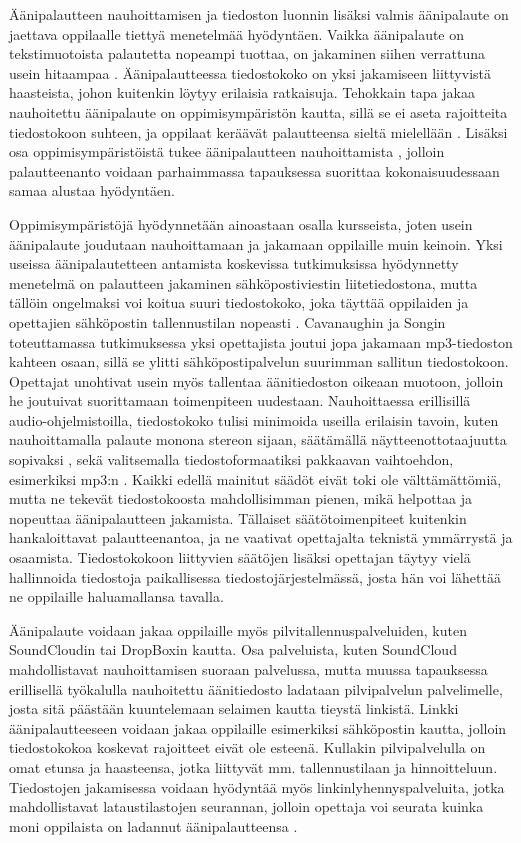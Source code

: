 \documentclass[utf8]{gradu3}
\begin{document}
Äänipalautteen nauhoittamisen ja tiedoston luonnin lisäksi valmis äänipalaute on jaettava oppilaalle tiettyä menetelmää hyödyntäen. Vaikka äänipalaute on tekstimuotoista palautetta nopeampi tuottaa, on jakaminen siihen verrattuna usein hitaampaa \parencite{evaluating}. Äänipalautteessa tiedostokoko on yksi jakamiseen liittyvistä haasteista, johon kuitenkin löytyy erilaisia ratkaisuja. Tehokkain tapa jakaa nauhoitettu äänipalaute on oppimisympäristön kautta, sillä se ei aseta rajoitteita tiedostokoon suhteen, ja oppilaat keräävät palautteensa sieltä mielellään \parencite{areYouListening}. Lisäksi osa oppimisympäristöistä tukee äänipalautteen nauhoittamista \parencite{using}, jolloin palautteenanto voidaan parhaimmassa tapauksessa suorittaa kokonaisuudessaan samaa alustaa hyödyntäen. 

Oppimisympäristöjä hyödynnetään ainoastaan osalla kursseista, joten usein äänipalaute joudutaan nauhoittamaan ja jakamaan oppilaille muin keinoin. Yksi useissa äänipalautetteen antamista koskevissa tutkimuksissa hyödynnetty menetelmä on palautteen jakaminen sähköpostiviestin liitetiedostona, mutta tällöin ongelmaksi voi koitua suuri tiedostokoko, joka täyttää oppilaiden ja opettajien sähköpostin tallennustilan nopeasti \parencite{developing}. Cavanaughin ja Songin \parencite*{versus} toteuttamassa tutkimuksessa yksi opettajista joutui jopa jakamaan mp3-tiedoston kahteen osaan, sillä se ylitti sähköpostipalvelun suurimman sallitun tiedostokoon. Opettajat unohtivat usein myös tallentaa äänitiedoston oikeaan muotoon, jolloin he joutuivat suorittamaan toimenpiteen uudestaan. Nauhoittaessa erillisillä audio-ohjelmistoilla, tiedostokoko tulisi minimoida useilla erilaisin tavoin, kuten nauhoittamalla palaute monona stereon sijaan, säätämällä näytteenottotaajuutta sopivaksi \parencite{voice}, sekä valitsemalla tiedostoformaatiksi pakkaavan vaihtoehdon, esimerkiksi mp3:n \parencite{engaging}. Kaikki edellä mainitut säädöt eivät toki ole välttämättömiä, mutta ne tekevät tiedostokoosta mahdollisimman pienen, mikä helpottaa ja nopeuttaa äänipalautteen jakamista. Tällaiset säätötoimenpiteet kuitenkin hankaloittavat palautteenantoa, ja ne vaativat opettajalta teknistä ymmärrystä ja osaamista. Tiedostokokoon liittyvien säätöjen lisäksi opettajan täytyy vielä hallinnoida tiedostoja paikallisessa tiedostojärjestelmässä, josta hän voi lähettää ne oppilaille haluamallansa tavalla.

Äänipalaute voidaan jakaa oppilaille myös pilvitallennuspalveluiden, kuten SoundCloudin tai DropBoxin kautta. Osa palveluista, kuten SoundCloud mahdollistavat nauhoittamisen suoraan palvelussa, mutta muussa tapauksessa erillisellä työkalulla nauhoitettu äänitiedosto ladataan pilvipalvelun palvelimelle, josta sitä päästään kuuntelemaan selaimen kautta tieystä linkistä. Linkki äänipalautteeseen voidaan jakaa oppilaille esimerkiksi sähköpostin kautta, jolloin tiedostokokoa koskevat rajoitteet eivät ole esteenä. Kullakin pilvipalvelulla on omat etunsa ja haasteensa, jotka liittyvät mm. tallennustilaan ja hinnoitteluun. Tiedostojen jakamisessa voidaan hyödyntää myös linkinlyhennyspalveluita, jotka mahdollistavat lataustilastojen seurannan, jolloin opettaja voi seurata kuinka moni oppilaista on ladannut äänipalautteensa \parencite{engaging}.
\end{document}
